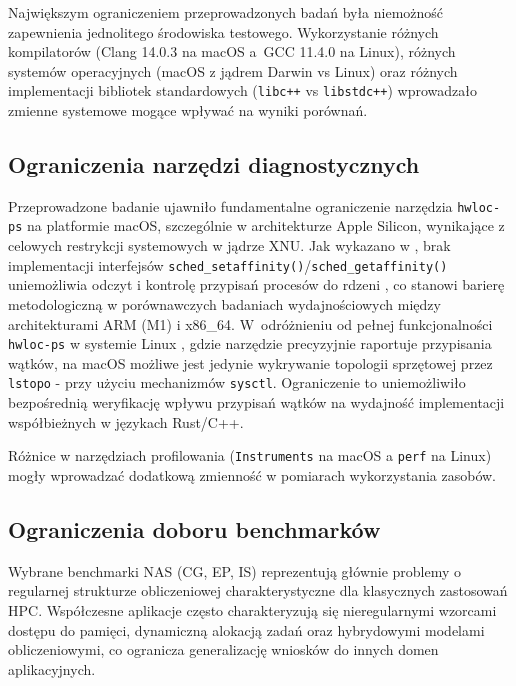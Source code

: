 Największym ograniczeniem przeprowadzonych badań była niemożność zapewnienia jednolitego środowiska testowego. Wykorzystanie różnych kompilatorów (Clang 14.0.3 na macOS a~GCC 11.4.0 na Linux), różnych systemów operacyjnych (macOS z jądrem Darwin vs Linux) oraz różnych implementacji bibliotek standardowych (\texttt{libc++} vs \texttt{libstdc++}) wprowadzało zmienne systemowe mogące wpływać na wyniki porównań.

\subsection{Ograniczenia narzędzi diagnostycznych}

Przeprowadzone badanie ujawniło fundamentalne ograniczenie narzędzia \texttt{hwloc-ps} na platformie macOS, szczególnie w architekturze Apple Silicon, wynikające z celowych restrykcji systemowych w jądrze XNU. Jak wykazano w \cite{HWLOC555}, brak implementacji interfejsów \texttt{sched\_setaffinity()}/\texttt{sched\_getaffinity()} uniemożliwia odczyt i kontrolę przypisań procesów do rdzeni , co stanowi barierę metodologiczną w porównawczych badaniach wydajnościowych między architekturami ARM (M1) i x86\_64. W~odróżnieniu od pełnej funkcjonalności \texttt{hwloc-ps} w systemie Linux \cite{hwlocHardwareLocality}, gdzie narzędzie precyzyjnie raportuje przypisania wątków, na macOS możliwe jest jedynie wykrywanie topologii sprzętowej przez \texttt{lstopo} - przy użyciu mechanizmów \texttt{sysctl}. Ograniczenie to uniemożliwiło bezpośrednią weryfikację wpływu przypisań wątków  na wydajność implementacji współbieżnych w językach Rust/C++.

Różnice w narzędziach profilowania (\texttt{Instruments} na macOS a \texttt{perf} na Linux) mogły wprowadzać dodatkową zmienność w pomiarach wykorzystania zasobów.

\subsection{Ograniczenia doboru benchmarków}

Wybrane benchmarki NAS (CG, EP, IS) reprezentują głównie problemy o regularnej strukturze obliczeniowej charakterystyczne dla klasycznych zastosowań HPC. Współczesne aplikacje często charakteryzują się nieregularnymi wzorcami dostępu do pamięci, dynamiczną alokacją zadań oraz hybrydowymi modelami obliczeniowymi, co ogranicza generalizację wniosków do innych domen aplikacyjnych.

